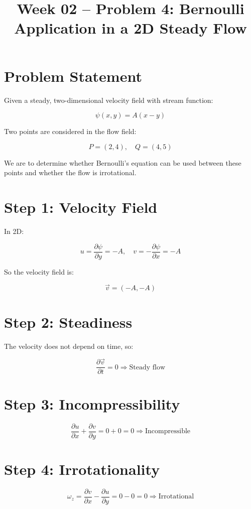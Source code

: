 \documentclass[12pt]{article}
\title{Week 02 -- Problem 4: Bernoulli Application in a 2D Steady Flow}
\date{}
\begin{document}
\maketitle

\section*{Problem Statement}

Given a steady, two-dimensional velocity field with stream function:

\[
\psi(x, y) = A(x - y)
\]

Two points are considered in the flow field:

\[
P = (2,4), \quad Q = (4,5)
\]

We are to determine whether Bernoulli's equation can be used between these points and whether the flow is irrotational.

\section*{Step 1: Velocity Field}

In 2D:

\[
u = \frac{\partial \psi}{\partial y} = -A, \quad v = -\frac{\partial \psi}{\partial x} = -A
\]

So the velocity field is:

\[
\vec{v} = (-A, -A)
\]

\section*{Step 2: Steadiness}

The velocity does not depend on time, so:

\[
\frac{\partial \vec{v}}{\partial t} = 0 \Rightarrow \text{Steady flow}
\]

\section*{Step 3: Incompressibility}

\[
\frac{\partial u}{\partial x} + \frac{\partial v}{\partial y} = 0 + 0 = 0 \Rightarrow \text{Incompressible}
\]

\section*{Step 4: Irrotationality}

\[
\omega_z = \frac{\partial v}{\partial x} - \frac{\partial u}{\partial y} = 0 - 0 = 0 \Rightarrow \text{Irrotational}
\]
\end{document}
